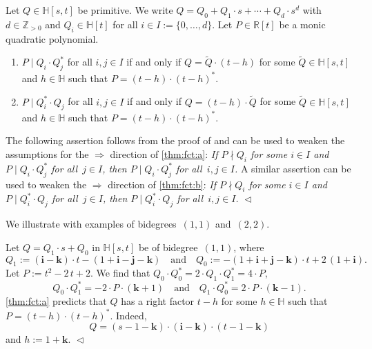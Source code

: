 \documentclass[11pt]{article}
\newenvironment{claims}{\begin{enumerate}[topsep=0pt,itemsep=0pt,leftmargin=8mm,label=\textnormal{\textbf{(\alph*)}},ref=(\alph*)]}{\end{enumerate}}
\newcommand{\R}{\mathbb{R}}
\renewcommand{\H}{\mathbb{H}}
\newcommand{\Z}{\mathbb{Z}}
\newcommand{\tQ}{\tilde{Q}}
\newcommand{\qi}{\mathbf{i}}
\newcommand{\qj}{\mathbf{j}}
\newcommand{\qk}{\mathbf{k}}
\newcommand{\st}{such that }
\newcommand{\END}{\hfill $\vartriangleleft$}
\begin{document}
\begin{theorem}
\label{thm:fct}
Let $Q\in \H[s,t]$ be primitive. We write
$Q=Q_0+Q_1\cdot s+\cdots+Q_d\cdot s^d$
with $d\in\Z_{>0}$ and $Q_i\in\H[t]$ for all $i\in I:=\{0,\ldots,d\}$.
Let $P\in\R[t]$ be a monic quadratic polynomial.
\begin{claims}
\item\label{thm:fct:a}
$P\mid Q_i\cdot Q_j^*$ for all $i,j\in I$
if and only if
$Q=\tQ\cdot (t-h)$
for some $\tQ\in\H[s,t]$ and $h\in\H$
\st $P=(t-h)\cdot (t-h)^*$.

\item\label{thm:fct:b}
$P\mid Q_i^*\cdot Q_j$ for all $i,j\in I$
if and only if
$Q=(t-h)\cdot \tQ$
for some $\tQ\in\H[s,t]$ and $h\in\H$
\st $P=(t-h)\cdot (t-h)^*$.


\end{claims}
\end{theorem}

\begin{remark}
\label{rmk:fct}
The following assertion follows from the proof of 
and can be used to weaken the assumptions for the $\Rightarrow$ direction of \ref{thm:fct:a}:
\textit{If $P\nmid Q_i$ for some $i\in I$ and $P\mid Q_i\cdot Q_j^*$ for all~$j\in I$,
then $P\mid Q_i\cdot Q_j^*$ for all~$i,j\in I$.}
A similar assertion can be used to weaken the $\Rightarrow$ direction of \ref{thm:fct:b}:
\textit{If $P\nmid Q_i$ for some $i\in I$ and $P\mid Q_i^*\cdot Q_j$ for all~$j\in I$,
then $P\mid Q_i^*\cdot Q_j$ for all~$i,j\in I$.}
\END
\end{remark}

We illustrate  with examples of bidegrees~$(1,1)$ and~$(2,2)$.

\begin{example}
\label{exm:fct1}
Let $Q=Q_1\cdot s+Q_0$ in $\H[s,t]$ be of bidegree~$(1,1)$,
where
\[
Q_1:=(\qi-\qk)\cdot t - (1+\qi-\qj-\qk)
\quad\text{and}\quad
Q_0:=-(1+\qi+\qj-\qk)\cdot t+2\,(1+\qi).
\]
Let $P:=t^2-2\,t+2$. We find that $Q_0\cdot Q_0^*=2\cdot Q_1\cdot Q_1^*=4\cdot P$,
\[
Q_0\cdot Q_1^*=-2\cdot P\cdot (\qk+1)
\quad\text{and}\quad
Q_1\cdot Q_0^*=2\cdot P\cdot (\qk-1).
\]
\ref{thm:fct:a} predicts that $Q$ has a right factor $t-h$ for some $h\in\H$
\st $P=(t-h)\cdot(t-h)^*$.
Indeed,
\[
Q=(s-1-\qk)\cdot(\qi-\qk)\cdot(t-1-\qk)
\]
and $h:=1+\qk$.
\END
\end{example}
\end{document}
